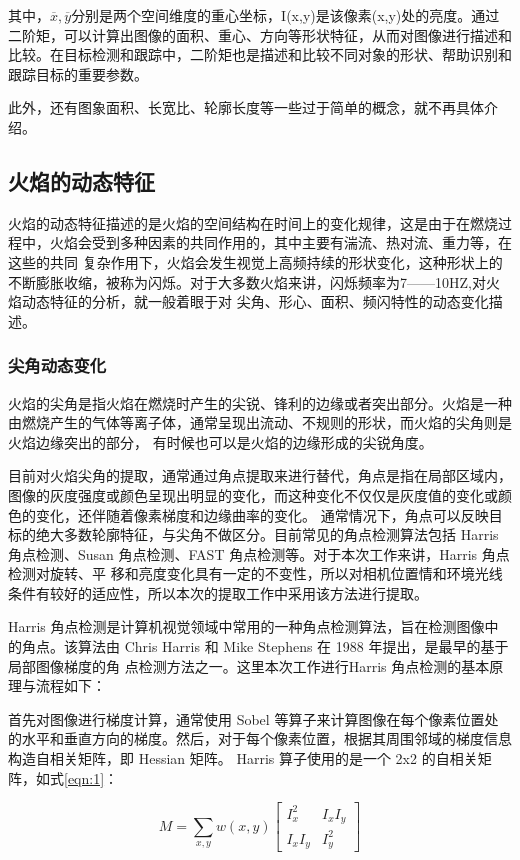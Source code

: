 其中，$\overline{x},\overline{y}$分别是两个空间维度的重心坐标，I(x,y)是该像素(x,y)处的亮度。通过二阶矩，可以计算出图像的面积、重心、方向等形状特征，从而对图像进行描述和比较。在目标检测和跟踪中，二阶矩也是描述和比较不同对象的形状、帮助识别和跟踪目标的重要参数。

此外，还有图象面积、长宽比、轮廓长度等一些过于简单的概念，就不再具体介绍。

\subsection{火焰的动态特征}
火焰的动态特征描述的是火焰的空间结构在时间上的变化规律，这是由于在燃烧过程中，火焰会受到多种因素的共同作用的，其中主要有湍流、热对流、重力等，在这些的共同
复杂作用下，火焰会发生视觉上高频持续的形状变化，这种形状上的不断膨胀收缩，被称为闪烁。对于大多数火焰来讲，闪烁频率为7——10HZ,对火焰动态特征的分析，就一般着眼于对
尖角、形心、面积、频闪特性的动态变化描述。
\subsubsection{尖角动态变化}
火焰的尖角是指火焰在燃烧时产生的尖锐、锋利的边缘或者突出部分。火焰是一种由燃烧产生的气体等离子体，通常呈现出流动、不规则的形状，而火焰的尖角则是火焰边缘突出的部分，
有时候也可以是火焰的边缘形成的尖锐角度。

目前对火焰尖角的提取，通常通过角点提取来进行替代，角点是指在局部区域内，图像的灰度强度或颜色呈现出明显的变化，而这种变化不仅仅是灰度值的变化或颜色的变化，还伴随着像素梯度和边缘曲率的变化。
通常情况下，角点可以反映目标的绝大多数轮廓特征，与尖角不做区分。目前常见的角点检测算法包括 Harris 角点检测、Susan 角点检测、FAST 角点检测等。对于本次工作来讲，Harris 角点检测对旋转、平
移和亮度变化具有一定的不变性，所以对相机位置情和环境光线条件有较好的适应性，所以本次的提取工作中采用该方法进行提取。

Harris 角点检测是计算机视觉领域中常用的一种角点检测算法，旨在检测图像中的角点。该算法由 Chris Harris 和 Mike Stephens 在 1988 年提出\cite{harris1988combined}，是最早的基于局部图像梯度的角
点检测方法之一。这里本次工作进行Harris 角点检测的基本原理与流程如下：

首先对图像进行梯度计算，通常使用 Sobel 等算子来计算图像在每个像素位置处的水平和垂直方向的梯度。然后，对于每个像素位置，根据其周围邻域的梯度信息构造自相关矩阵，即 Hessian 矩阵。
Harris 算子使用的是一个 2x2 的自相关矩阵，如式\ref{eqn:1}：

\begin{equation} \label{eqn:1}
    M = \sum_{x, y} w(x, y)
    \begin{bmatrix}
        I_x ^2&I_xI_y\\I_xI_y&I_y ^2
    \end{bmatrix}
\end{equation}

